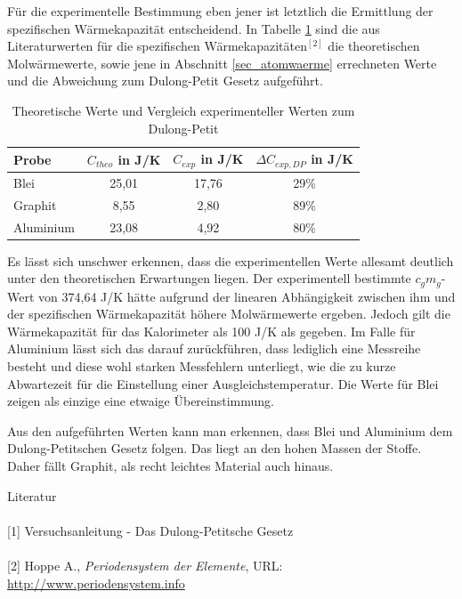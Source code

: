 Für die experimentelle Bestimmung eben jener ist letztlich die Ermittlung der spezifischen Wärmekapazität entscheidend. In Tabelle 
\ref{tab_diskussion} sind die aus Literaturwerten für die spezifischen Wärmekapazitäten$^{[2]}$ die theoretischen Molwärmewerte, sowie
jene in Abschnitt \ref{sec_atomwaerme} errechneten Werte und die Abweichung zum Dulong-Petit Gesetz aufgeführt.
\begin{table}[H]
 \begin{tabular}{l|c|c|c}
 Probe & $C_{theo}$ in J/K	& $C_{exp}$ in J/K & $\Delta C_{exp,DP}$ in J/K\\
 \hline
Blei	&25,01	&17,76	&29\% \\
Graphit	&8,55	&2,80	&89\% \\
Aluminium	&23,08	&4,92	&80\% 
 \end{tabular}
\caption{Theoretische Werte und Vergleich experimenteller Werten zum Dulong-Petit}
\label{tab_diskussion}
\end{table}

Es lässt sich unschwer erkennen, dass die experimentellen Werte allesamt deutlich unter den theoretischen Erwartungen liegen. Der 
experimentell bestimmte $c_gm_g$-Wert von 374,64 J/K hätte aufgrund der linearen Abhängigkeit zwischen ihm und der spezifischen 
Wärmekapazität höhere Molwärmewerte ergeben. Jedoch gilt die Wärmekapazität für das Kalorimeter als 100 J/K als gegeben. Im Falle
für Aluminium lässt sich das darauf zurückführen, dass lediglich eine Messreihe besteht und diese wohl starken Messfehlern unterliegt,
wie die zu kurze Abwartezeit für die Einstellung einer Ausgleichstemperatur. Die Werte für Blei zeigen als einzige eine etwaige 
Übereinstimmung.

Aus den aufgeführten Werten kann man erkennen, dass Blei und Aluminium dem Dulong-Petitschen Gesetz folgen. Das liegt an den hohen Massen
der Stoffe. Daher fällt Graphit, als recht leichtes Material auch hinaus.

\parskip 340pt
\Large{Literatur}\\\\
\large{[1] Versuchsanleitung - Das Dulong-Petitsche Gesetz}\\\\
\large{[2] Hoppe A., \textit{Periodensystem der Elemente}, URL: \href{http://www.periodensystem.info}{http://www.periodensystem.info}}\\\\





